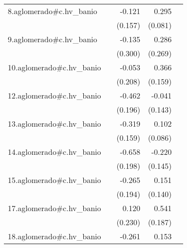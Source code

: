 {\begin{longtable}{l*{4}{D{.}{.}{-1}}}
\addlinespace
8.aglomerado#c.hv\_banio&                     &      -0.121         &       0.295\sym{***}&                     \\
            &                     &     (0.157)         &     (0.081)         &                     \\
\addlinespace
9.aglomerado#c.hv\_banio&                     &      -0.135         &       0.286         &                     \\
            &                     &     (0.300)         &     (0.269)         &                     \\
\addlinespace
10.aglomerado#c.hv\_banio&                     &      -0.053         &       0.366\sym{*}  &                     \\
            &                     &     (0.208)         &     (0.159)         &                     \\
\addlinespace
12.aglomerado#c.hv\_banio&                     &      -0.462\sym{*}  &      -0.041         &                     \\
            &                     &     (0.196)         &     (0.143)         &                     \\
\addlinespace
13.aglomerado#c.hv\_banio&                     &      -0.319\sym{*}  &       0.102         &                     \\
            &                     &     (0.159)         &     (0.086)         &                     \\
\addlinespace
14.aglomerado#c.hv\_banio&                     &      -0.658\sym{***}&      -0.220         &                     \\
            &                     &     (0.198)         &     (0.145)         &                     \\
\addlinespace
15.aglomerado#c.hv\_banio&                     &      -0.265         &       0.151         &                     \\
            &                     &     (0.194)         &     (0.140)         &                     \\
\addlinespace
17.aglomerado#c.hv\_banio&                     &       0.120         &       0.541\sym{**} &                     \\
            &                     &     (0.230)         &     (0.187)         &                     \\
\addlinespace
18.aglomerado#c.hv\_banio&                     &      -0.261         &       0.153\sym{*}  &                     \\

\end{longtable}}
